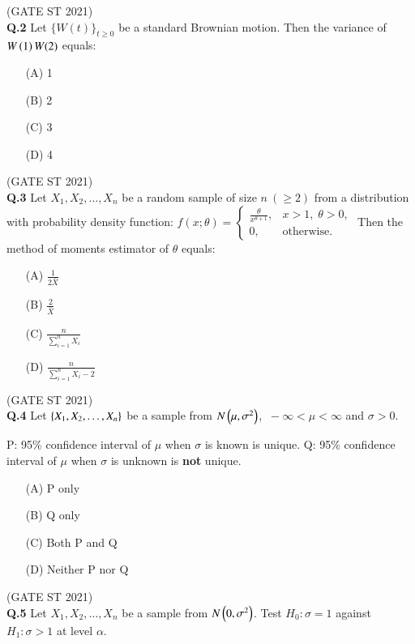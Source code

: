 \documentclass[journal,12pt,onecolumn]{IEEEtran}
\theoremstyle{remark}
\begin{document}
\hfill (GATE ST 2021) \\


\textbf{Q.2}
Let $\{W(t)\}_{t \geq 0}$ be a standard Brownian motion.  
Then the variance of $W\left(1\right) W(2)$ equals:
\begin{enumerate}
\item[(A)] 1
\item[(B)] 2
\item[(C)] 3
\item[(D)] 4
\end{enumerate}

\hfill (GATE ST 2021) \\

\textbf{Q.3}
Let $X_1, X_2, \dots, X_n$ be a random sample of size $n \ (\geq 2)$ from a distribution with probability density function:
$
f(x; \theta) =
\begin{cases}
\frac{\theta}{x^{\theta+1}}, & x > 1, \; \theta > 0, \\
0, & \text{otherwise}.
\end{cases}
$
Then the method of moments estimator of $\theta$ equals:
\begin{enumerate}
\item[(A)] $\frac{1}{2\bar{X}}$
\item[(B)] $\frac{2}{\bar{X}}$
\item[(C)] $\frac{n}{\sum_{i=1}^n X_i}$
\item[(D)] $\frac{n}{\sum_{i=1}^n X_i - 2}$
\end{enumerate}

\hfill (GATE ST 2021) \\

\textbf{Q.4}
Let $\left\{ X_1, X_2, \dots, X_n \right\}$ be a sample from $N\left(\mu,\sigma^2\right)$, $\ -\infty < \mu < \infty$ and $\sigma > 0$.

P: 95\% confidence interval of $\mu$ when $\sigma$ is known is unique.  
Q: 95\% confidence interval of $\mu$ when $\sigma$ is unknown is \textbf{not} unique.

\begin{enumerate}
\item[(A)] P only
\item[(B)] Q only
\item[(C)] Both P and Q
\item[(D)] Neither P nor Q
\end{enumerate}
\hfill (GATE ST 2021) \\


\textbf{Q.5}
Let $X_1, X_2, \dots, X_n$ be a sample from $N\left(0,\sigma^2\right)$.  
Test $H_0: \sigma = 1$ against $H_1: \sigma > 1$ at level $\alpha$.
\end{document}
